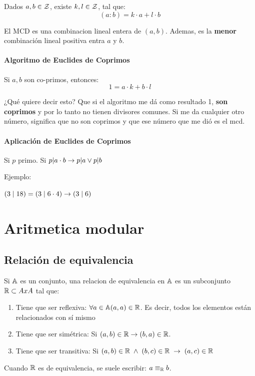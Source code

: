 \documentclass[12pt,a4paper]{report}
\begin{document}
Dados $a, b \in \mathcal{{Z}}$, existe $k, l \in \mathcal{{Z}}$, tal que:
$$
(a: b) = k \cdot a + l \cdot b
$$

El MCD es una combinacion lineal entera de $(a, b)$. Ademas, es la \textbf{menor} combinación lineal positiva entra $a$ y $b$.

\subsubsection{Algoritmo de Euclides de Coprimos}

Si $a, b$ son co-primos, entonces:
$$
1= a \cdot k + b \cdot l
$$

¿Qué quiere decir esto? Que si el algoritmo me dá como resultado 1, \textbf{son coprimos} y por lo tanto no tienen divisores comunes.
Si me da cualquier otro número, significa que no son coprimos y que ese número que me dió es el mcd.

\subsubsection{Aplicación de Euclides de Coprimos}
Si $p$ primo. Si $p | a \cdot b \rightarrow p | a \lor p | b$


Ejemplo:


$(3 \mid 18) = (3 \mid 6 \cdot 4) \rightarrow (3 \mid 6)$

\chapter{Aritmetica modular}

\section{Relación de equivalencia}
Si $\mathbb{{A}}$ es un conjunto, una relacion de equivalencia en $\mathbb{{A}}$ es un subconjunto $\mathbb{{R}} \subset A x A$ tal que:
\begin{enumerate}
    \item{Tiene que ser reflexiva: $\forall a \in \mathbb{{A}} (a,a) \in \mathbb{{R}}$. Es decir, todos los elementos están relacionados con sí mismo}
    \item{Tiene que ser simétrica: Si $(a, b) \in \mathbb{{R}} \rightarrow (b, a) \in \mathbb{{R}}$.}
    \item{Tiene que ser transitiva: Si $(a,b) \in \mathbb{{R}} \;\land\; (b,c) \in \mathbb{{R}} \;\rightarrow\; (a,c) \in \mathbb{{R}}$}
\end{enumerate}

Cuando $\mathbb{{R}}$ es de equivalencia, se suele escribir: $a \equiv_{\mathbb{{R}}} b$.
\end{document}
